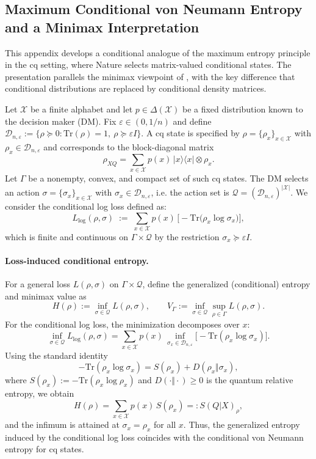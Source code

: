\documentclass{article}
\theoremstyle{plain}
\theoremstyle{definition}
\begin{document}
\begin{appendices}
\subsection{Maximum Conditional von Neumann Entropy and a Minimax Interpretation}
\label{app:conditional-maxvne}

This appendix develops a conditional analogue of the maximum entropy principle in the
cq setting, where Nature selects matrix-valued conditional states.
The presentation parallels the minimax viewpoint of \cite{FarniaTse2016Minimax},
with the key difference that conditional distributions are replaced by conditional
density matrices.

Let $\mathcal{X}$ be a finite alphabet and let $p\in\Delta(\mathcal{X})$ be a fixed
distribution known to the decision maker (DM). Fix $\varepsilon\in(0,1/n)$ and define
$\mathcal{D}_{n,\varepsilon}:=\{\rho\succeq 0:\mathrm{Tr}(\rho)=1,\ \rho\succeq\varepsilon I\}$.
A cq state is specified by $\rho=\{\rho_x\}_{x\in\mathcal{X}}$ with
$\rho_x\in\mathcal{D}_{n,\varepsilon}$ and corresponds to the block-diagonal matrix
\[
\rho_{XQ}
=
\sum_{x\in\mathcal{X}} p(x)\,|x\rangle\langle x|\otimes\rho_x .
\]
Let $\Gamma$ be a nonempty, convex, and compact set of such cq states.
The DM selects an action $\sigma=\{\sigma_x\}_{x\in\mathcal{X}}$ with
$\sigma_x\in\mathcal{D}_{n,\varepsilon}$, i.e. the action set is
$\mathcal{Q}=(\mathcal{D}_{n,\varepsilon})^{|\mathcal{X}|}$. We consider the conditional log loss defined as:
\begin{equation}
L_{\log}(\rho,\sigma)
\;:=\;
\sum_{x\in\mathcal{X}} p(x)\,
\bigl[-\mathrm{Tr}\bigl(\rho_x\log\sigma_x\bigr)\bigr],
\label{eq:cond-log-loss}
\end{equation}
which is finite and continuous on $\Gamma\times\mathcal{Q}$ by the restriction
$\sigma_x\succeq\varepsilon I$.

\paragraph{Loss-induced conditional entropy.}
For a general loss $L(\rho,\sigma)$ on $\Gamma\times\mathcal{Q}$, define the generalized
(conditional) entropy and minimax value as
\[
H(\rho):=\inf_{\sigma\in\mathcal{Q}} L(\rho,\sigma),
\qquad
V_\Gamma:=\inf_{\sigma\in\mathcal{Q}}\sup_{\rho\in\Gamma} L(\rho,\sigma).
\]
For the conditional log loss, the minimization decomposes over $x$:
\[
\inf_{\sigma\in\mathcal{Q}} L_{\log}(\rho,\sigma)
=
\sum_{x\in\mathcal{X}} p(x)\,
\inf_{\sigma_x\in\mathcal{D}_{n,\varepsilon}}
\bigl[-\mathrm{Tr}(\rho_x\log\sigma_x)\bigr].
\]
Using the standard identity
\[
-\mathrm{Tr}(\rho_x\log\sigma_x)=S(\rho_x)+D(\rho_x\Vert\sigma_x),
\]
where $S(\rho_x):=-\mathrm{Tr}(\rho_x\log\rho_x)$ and $D(\cdot\Vert\cdot)\ge 0$ is the
quantum relative entropy, we obtain
\begin{equation}
H(\rho)
=
\sum_{x\in\mathcal{X}} p(x)\,S(\rho_x)
=: S(Q|X)_\rho,
\label{eq:cond-vne}
\end{equation}
and the infimum is attained at $\sigma_x=\rho_x$ for all $x$.
Thus, the generalized entropy induced by the conditional log loss coincides with the
conditional von Neumann entropy for cq states.


\end{appendices}
\end{document}
